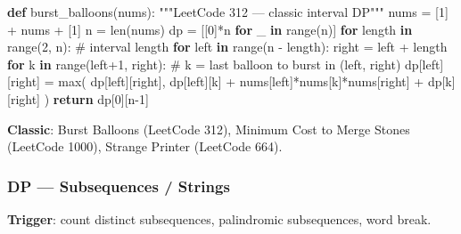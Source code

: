 \documentclass[11pt]{article}
\newenvironment{Shaded}{\begin{snugshade}}{\end{snugshade}}
\newcommand{\BuiltInTok}[1]{\textcolor[rgb]{0.50,0.55,0.55}{#1}}
\newcommand{\CommentTok}[1]{\textcolor[rgb]{0.48,0.49,0.49}{#1}}
\newcommand{\ControlFlowTok}[1]{\textcolor[rgb]{0.99,0.74,0.29}{\textbf{#1}}}
\newcommand{\DecValTok}[1]{\textcolor[rgb]{0.96,0.45,0.00}{#1}}
\newcommand{\KeywordTok}[1]{\textcolor[rgb]{0.81,0.81,0.76}{\textbf{#1}}}
\newcommand{\NormalTok}[1]{\textcolor[rgb]{0.81,0.81,0.76}{#1}}
\newcommand{\OperatorTok}[1]{\textcolor[rgb]{0.81,0.81,0.76}{#1}}
\begin{document}
\begin{Shaded}
\begin{Highlighting}[]
\KeywordTok{def}\NormalTok{ burst\_balloons(nums):}
    \CommentTok{"""LeetCode 312 — classic interval DP"""}
\NormalTok{    nums }\OperatorTok{=}\NormalTok{ [}\DecValTok{1}\NormalTok{] }\OperatorTok{+}\NormalTok{ nums }\OperatorTok{+}\NormalTok{ [}\DecValTok{1}\NormalTok{]}
\NormalTok{    n }\OperatorTok{=} \BuiltInTok{len}\NormalTok{(nums)}
\NormalTok{    dp }\OperatorTok{=}\NormalTok{ [[}\DecValTok{0}\NormalTok{]}\OperatorTok{*}\NormalTok{n }\ControlFlowTok{for}\NormalTok{ \_ }\KeywordTok{in} \BuiltInTok{range}\NormalTok{(n)]}
    \ControlFlowTok{for}\NormalTok{ length }\KeywordTok{in} \BuiltInTok{range}\NormalTok{(}\DecValTok{2}\NormalTok{, n):               }\CommentTok{\# interval length}
        \ControlFlowTok{for}\NormalTok{ left }\KeywordTok{in} \BuiltInTok{range}\NormalTok{(n }\OperatorTok{{-}}\NormalTok{ length):}
\NormalTok{            right }\OperatorTok{=}\NormalTok{ left }\OperatorTok{+}\NormalTok{ length}
            \ControlFlowTok{for}\NormalTok{ k }\KeywordTok{in} \BuiltInTok{range}\NormalTok{(left}\OperatorTok{+}\DecValTok{1}\NormalTok{, right):   }\CommentTok{\# k = last balloon to burst in (left, right)}
\NormalTok{                dp[left][right] }\OperatorTok{=} \BuiltInTok{max}\NormalTok{(}
\NormalTok{                    dp[left][right],}
\NormalTok{                    dp[left][k] }\OperatorTok{+}\NormalTok{ nums[left]}\OperatorTok{*}\NormalTok{nums[k]}\OperatorTok{*}\NormalTok{nums[right] }\OperatorTok{+}\NormalTok{ dp[k][right]}
\NormalTok{                )}
    \ControlFlowTok{return}\NormalTok{ dp[}\DecValTok{0}\NormalTok{][n}\OperatorTok{{-}}\DecValTok{1}\NormalTok{]}
\end{Highlighting}
\end{Shaded}

\textbf{Classic}: Burst Balloons (LeetCode 312), Minimum Cost to Merge Stones (LeetCode 1000), Strange Printer (LeetCode 664).

\subsubsection{DP --- Subsequences / Strings}\label{dp--subsequences--strings}

\textbf{Trigger}: count distinct subsequences, palindromic subsequences, word break.

\end{document}
